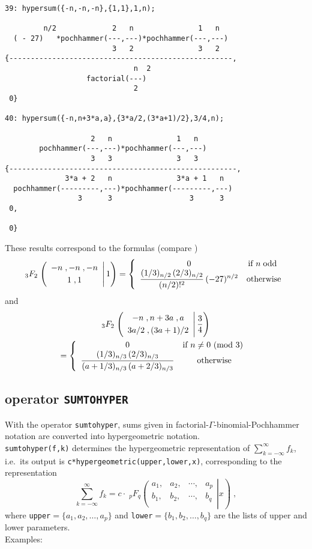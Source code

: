 {\small
\begin{verbatim}
39: hypersum({-n,-n,-n},{1,1},1,n);

         n/2             2   n               1   n
  ( - 27)   *pochhammer(---,---)*pochhammer(---,---)
                         3   2               3   2
{----------------------------------------------------,
                              n  2
                   factorial(---)
                              2
 0}

40: hypersum({-n,n+3*a,a},{3*a/2,(3*a+1)/2},3/4,n);

                    2   n               1   n
        pochhammer(---,---)*pochhammer(---,---)
                    3   3               3   3
{-----------------------------------------------------,
              3*a + 2   n               3*a + 1   n
  pochhammer(---------,---)*pochhammer(---------,---)
                 3      3                  3      3
 0,

 0}
\end{verbatim}
}\noindent
These results correspond to the formulas (compare \cite{Koepf:94b})
\[
_3 F_2\left.
\left(
\begin{array}{c}
-n\;, -n\;, -n\\[1mm]
1 \;, 1
\end{array}
\right| 1\right)
=
\left\{\begin{array}{cc} 0 & \text{if $n\;\mbox{odd}$ } \\ \displaystyle
\frac{(1/3)_{n/2}\,(2/3)_{n/2}}{(n/2)!^2}\,(-27)^{n/2}
 & \text{otherwise} \end{array}\right.
\]
and
\begin{multline*}
_3 F_2\left.
\left(
\begin{array}{c}
-n\;, n+3a\;, a\\[1mm]
3a/2\;,(3a+1)/2
\end{array}
\right| \frac{3}{4}\right) \\
=
\left\{\begin{array}{cc} 0 & \text{if $n\neq 0 {\mbox{ (mod }} 3)$ } \\ \displaystyle
\frac{(1/3)_{n/3}\,(2/3)_{n/3}}
{(a+1/3)_{n/3}\,(a+2/3)_{n/3}}
 & \text{otherwise} \end{array}\right.
\end{multline*}

\subsection{\REDUCE{} operator \texttt{SUMTOHYPER}}
\hypertarget{operator:SUMTOHYPER}{}

With the operator \texttt{sumtohyper}, sums given in
factorial-$\Gamma$-binomial-Poch\-hammer notation
are converted into hypergeometric notation.\\
\texttt{sumtohyper(f,k)} determines the hypergeometric representation
of
$\sum\limits_{k=-\infty}^\infty f_k$,
i.e.\
its output is \texttt{c*hypergeometric(upper,lower,x)}, corresponding to
the representation
\[
\sum\limits_{k=-\infty}^\infty f_k=c\cdot\;
_{p}F_{q}\left.\left(\begin{array}{cccc}
a_{1},&a_{2},&\cdots,&a_{p}\\
b_{1},&b_{2},&\cdots,&b_{q}\\
            \end{array}\right| x\right)
\;,
\]
where \texttt{upper}$=\{a_{1}, a_{2}, \ldots, a_{p}\}$
and \texttt{lower}$=\{b_{1}, b_{2}, \ldots, b_{q}\}$
are the lists of upper and lower parameters.
\\
Examples:

